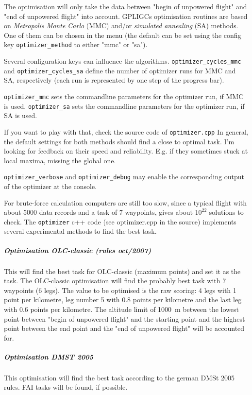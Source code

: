 The optimisation will only take the data between "begin of unpowered flight" and "end of unpowered flight" into account.
GPLIGCs optimisation routines are based on \emph{Metropolis Monte Carlo} (MMC) and/or \emph{simulated annealing} (SA) methods.
One of them can be chosen in the menu (the default can be set using the config key \texttt{optimizer\_method} to either "mmc" or "sa").

Several configuration keys can influence the algorithms.
\texttt{optimizer\_cycles\_mmc} and \texttt{optimizer\_cycles\_sa} define the number of optimizer runs for MMC and SA, respectively (each run is represented by one step of the progress bar).

\texttt{optimizer\_mmc} sets the commandline parameters for the optimizer run, if MMC is used.
\texttt{optimizer\_sa} sets the commandline parameters for the optimizer run, if SA is used.

If you want to play with that, check the source code of \texttt{optimizer.cpp}
In general, the default settings for both methods should find a close to optimal task.
I'm looking for feedback on their speed and reliability.
E.g. if they sometimes stuck at local maxima, missing the global one.

\texttt{optimizer\_verbose} and \texttt{optimizer\_debug} may enable the corresponding output of the optimizer at the console.

For brute-force calculation computers are still too slow, since a typical flight with about 5000 data records and a task of 7 waypoints, gives about $10^{22}$ solutions to check. The \texttt{optimizer} c++ code (see optimizer.cpp in the source) implements several experimental methods to find the best task.



\subparagraph{Optimisation OLC-classic (rules oct/2007)}
This will find the best task for OLC-classic (maximum points) and set it  as  the task.
The OLC-classic optimisation will find the probably best task with 7 waypoints (6 legs). The value to be optimised is the raw scoring: 4 legs with 1 point per kilometre, leg number 5 with 0.8 points per kilometre and the last leg with 0.6 points per kilometre. The altitude limit of 1000~m between the lowest point between "begin of unpowered flight" and the starting point and the highest point between the end point and the "end of unpowered flight" will be accounted  for.

\subparagraph{Optimisation DMST 2005}
This optimisation will find the best task according to the german DMSt 2005 rules. FAI tasks will be found, if possible.

